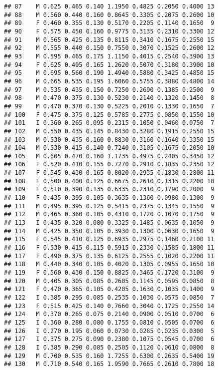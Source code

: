 \documentclass[
]{article}
\begin{document}
\begin{verbatim}
## 87    M 0.625 0.465 0.140 1.1950 0.4825 0.2050 0.4000 13
## 88    M 0.560 0.440 0.160 0.8645 0.3305 0.2075 0.2600 10
## 89    F 0.460 0.355 0.130 0.5170 0.2205 0.1140 0.1650  9
## 90    F 0.575 0.450 0.160 0.9775 0.3135 0.2310 0.3300 12
## 91    M 0.565 0.425 0.135 0.8115 0.3410 0.1675 0.2550 15
## 92    M 0.555 0.440 0.150 0.7550 0.3070 0.1525 0.2600 12
## 93    M 0.595 0.465 0.175 1.1150 0.4015 0.2540 0.3900 13
## 94    F 0.625 0.495 0.165 1.2620 0.5070 0.3180 0.3900 10
## 95    M 0.695 0.560 0.190 1.4940 0.5880 0.3425 0.4850 15
## 96    M 0.665 0.535 0.195 1.6060 0.5755 0.3880 0.4800 14
## 97    M 0.535 0.435 0.150 0.7250 0.2690 0.1385 0.2500  9
## 98    M 0.470 0.375 0.130 0.5230 0.2140 0.1320 0.1450  8
## 99    M 0.470 0.370 0.130 0.5225 0.2010 0.1330 0.1650  7
## 100   F 0.475 0.375 0.125 0.5785 0.2775 0.0850 0.1550 10
## 101   I 0.360 0.265 0.095 0.2315 0.1050 0.0460 0.0750  7
## 102   M 0.550 0.435 0.145 0.8430 0.3280 0.1915 0.2550 15
## 103   M 0.530 0.435 0.160 0.8830 0.3160 0.1640 0.3350 15
## 104   M 0.530 0.415 0.140 0.7240 0.3105 0.1675 0.2050 10
## 105   M 0.605 0.470 0.160 1.1735 0.4975 0.2405 0.3450 12
## 106   F 0.520 0.410 0.155 0.7270 0.2910 0.1835 0.2350 12
## 107   F 0.545 0.430 0.165 0.8020 0.2935 0.1830 0.2800 11
## 108   F 0.500 0.400 0.125 0.6675 0.2610 0.1315 0.2200 10
## 109   F 0.510 0.390 0.135 0.6335 0.2310 0.1790 0.2000  9
## 110   F 0.435 0.395 0.105 0.3635 0.1360 0.0980 0.1300  9
## 111   M 0.495 0.395 0.125 0.5415 0.2375 0.1345 0.1550  9
## 112   M 0.465 0.360 0.105 0.4310 0.1720 0.1070 0.1750  9
## 113   I 0.435 0.320 0.080 0.3325 0.1485 0.0635 0.1050  9
## 114   M 0.425 0.350 0.105 0.3930 0.1300 0.0630 0.1650  9
## 115   F 0.545 0.410 0.125 0.6935 0.2975 0.1460 0.2100 11
## 116   F 0.530 0.415 0.115 0.5915 0.2330 0.1585 0.1800 11
## 117   F 0.490 0.375 0.135 0.6125 0.2555 0.1020 0.2200 11
## 118   M 0.440 0.340 0.105 0.4020 0.1305 0.0955 0.1650 10
## 119   F 0.560 0.430 0.150 0.8825 0.3465 0.1720 0.3100  9
## 120   M 0.405 0.305 0.085 0.2605 0.1145 0.0595 0.0850  8
## 121   F 0.470 0.365 0.105 0.4205 0.1630 0.1035 0.1400  9
## 122   I 0.385 0.295 0.085 0.2535 0.1030 0.0575 0.0850  7
## 123   F 0.515 0.425 0.140 0.7660 0.3040 0.1725 0.2550 14
## 124   M 0.370 0.265 0.075 0.2140 0.0900 0.0510 0.0700  6
## 125   I 0.360 0.280 0.080 0.1755 0.0810 0.0505 0.0700  6
## 126   I 0.270 0.195 0.060 0.0730 0.0285 0.0235 0.0300  5
## 127   I 0.375 0.275 0.090 0.2380 0.1075 0.0545 0.0700  6
## 128   I 0.385 0.290 0.085 0.2505 0.1120 0.0610 0.0800  8
## 129   M 0.700 0.535 0.160 1.7255 0.6300 0.2635 0.5400 19
## 130   M 0.710 0.540 0.165 1.9590 0.7665 0.2610 0.7800 18

\end{verbatim}
\end{document}

